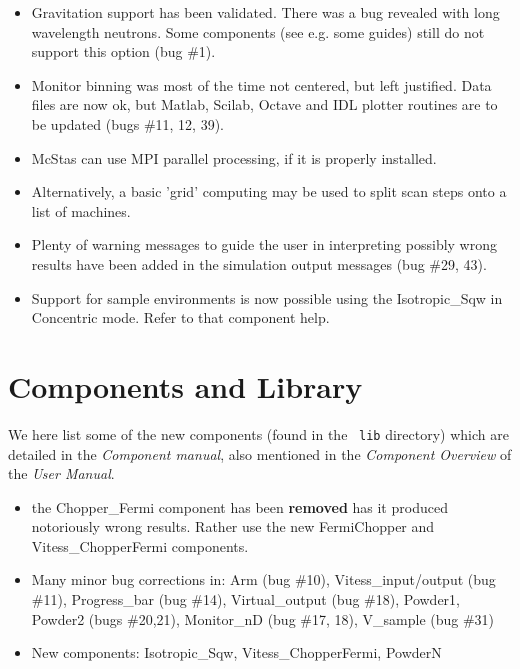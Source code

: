 \begin{itemize}
\item Gravitation support has been validated. There was a bug revealed with long wavelength neutrons. Some components (see e.g. some guides) still do not support this option (bug \#1).
\item Monitor binning was most of the time not centered, but left justified. Data files are now ok, but Matlab, Scilab, Octave and IDL plotter routines are to be updated (bugs \#11, 12, 39).

\item McStas can use MPI parallel processing, if it is properly installed.
\item Alternatively, a basic 'grid' computing may be used to split scan steps onto a list of machines.

\item Plenty of warning messages to guide the user in interpreting possibly wrong results have been added in the simulation output messages (bug \#29, 43).
\item Support for sample environments is now possible using the Isotropic\_Sqw in Concentric mode. Refer to that component help.

\end{itemize}


\section{Components and Library}
\label{s:new-features:components}
 

We here list some of the new components (found in the \MCS\ \verb+lib+ directory)
which are detailed in the {\it Component manual}, also mentioned in
the {\it Component Overview} of the {\it User Manual}.

\begin{itemize}
\item the Chopper\_Fermi component has been {\bf removed} has it produced notoriously wrong results. Rather use the new FermiChopper and Vitess\_ChopperFermi components.
\item Many minor bug corrections in:
Arm (bug \#10),
Vitess\_input/output (bug \#11),
Progress\_bar (bug \#14),
Virtual\_output (bug \#18),
Powder1, Powder2 (bugs \#20,21),
Monitor\_nD (bug \#17, 18),
V\_sample (bug \#31)
\item New components:
Isotropic\_Sqw,
Vitess\_ChopperFermi,
PowderN
\end{itemize}

